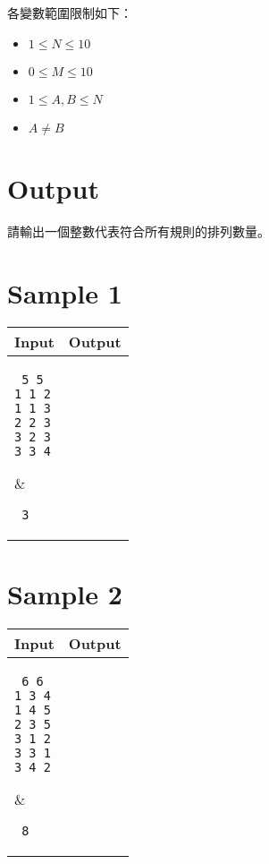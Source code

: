 \documentclass[11pt,a4paper]{article}
\begin{document}
\newpage
各變數範圍限制如下：
\begin{itemize}
    \item $1 \le N \le 10$
    \item $0 \le M \le 10$
    \item $1 \le A, B \le N$
    \item $A \neq B$
\end{itemize}

\section*{Output}

請輸出一個整數代表符合所有規則的排列數量。

\section*{Sample 1}
\begin{longtable}[!h]{|p{}|p{}|}
\hline
\textbf {Input}	& \textbf {Output} \\
\hline
\parbox[t]{0.5\textwidth} %
{ \tt
5 5 \\
1 1 2 \\ 
1 1 3 \\ 
2 2 3 \\
3 2 3 \\
3 3 4 \\
} &
\parbox[t]{0.5\textwidth}
{ \tt
3 \\
} \\
\hline
\end{longtable}

\section*{Sample 2}
\begin{longtable}[!h]{|p{}|p{}|}
\hline
\textbf {Input}	& \textbf {Output} \\
\hline
\parbox[t]{0.5\textwidth} %
{ \tt
6 6 \\
1 3 4 \\
1 4 5 \\
2 3 5 \\
3 1 2 \\
3 3 1 \\
3 4 2 \\
} &
\parbox[t]{0.5\textwidth}
{ \tt
8 \\
} \\
\hline
\end{longtable}
\end{document}
